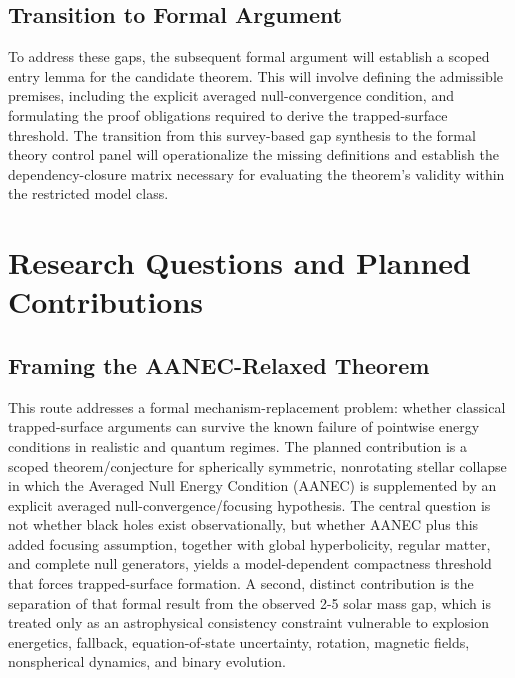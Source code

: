 \documentclass[conference]{IEEEtran}
\begin{document}
\subsection{Transition to Formal Argument}
To address these gaps, the subsequent formal argument will establish a scoped entry lemma for the candidate theorem. This will involve defining the admissible premises, including the explicit averaged null-convergence condition, and formulating the proof obligations required to derive the trapped-surface threshold. The transition from this survey-based gap synthesis to the formal theory control panel will operationalize the missing definitions and establish the dependency-closure matrix necessary for evaluating the theorem's validity within the restricted model class.

\section{Research Questions and Planned Contributions}
\subsection{Framing the AANEC-Relaxed Theorem}
This route addresses a formal mechanism-replacement problem: whether classical trapped-surface arguments can survive the known failure of pointwise energy conditions in realistic and quantum regimes. The planned contribution is a scoped theorem/conjecture for spherically symmetric, nonrotating stellar collapse in which the Averaged Null Energy Condition (AANEC) is supplemented by an explicit averaged null-convergence/focusing hypothesis. The central question is not whether black holes exist observationally, but whether AANEC plus this added focusing assumption, together with global hyperbolicity, regular matter, and complete null generators, yields a model-dependent compactness threshold that forces trapped-surface formation. A second, distinct contribution is the separation of that formal result from the observed 2-5 solar mass gap, which is treated only as an astrophysical consistency constraint vulnerable to explosion energetics, fallback, equation-of-state uncertainty, rotation, magnetic fields, nonspherical dynamics, and binary evolution.~\cite{cite_07d6df5d6978a1fc,cite_0ed84243cf171bc4,cite_42e341ff6471ce89,cite_789b47fb0241d9ae,cite_7a407c865faafd11,cite_7a44e6730c44cb39,cite_977568cf7b8a55bf,cite_cbbced417410bc6c,cite_f634820e22d7a238,cite_fd0f77b2a173c0ab}
\end{document}
